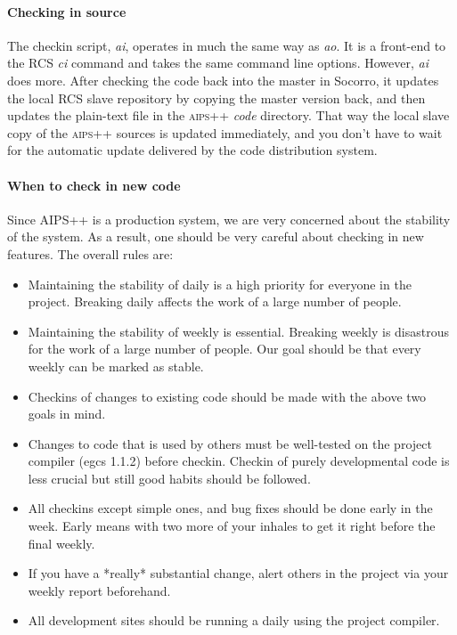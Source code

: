 \paragraph{Checking in source}
The checkin script, \textit{ai}, operates in much the same way as \textit{ao}.  It is a
front-end to the RCS \textit{ci} command and takes the same command line options.
However, \textit{ai} does more.  After checking the code back into the master in
Socorro, it updates the local RCS slave repository by copying the
master version back, and then updates the plain-text file in the \textsc{aips++}
\textsl{code} directory.  That way the local slave copy of the \textsc{aips++}
sources is updated immediately, and you don't have to wait for the automatic
update delivered by the code distribution system.

\paragraph{When to check in new code}

Since AIPS++ is a production system, we are very concerned about the
stability of the system. As a result, one should be very careful about
checking in new features. The overall rules are:

\begin{itemize}
\item Maintaining the stability of daily is a high priority for
everyone in the project. Breaking daily affects the work of a large
number of people.
\item Maintaining the stability of weekly is essential. Breaking
weekly is disastrous for the work of a large number of people. Our
goal should be that every weekly can be marked as stable.
\item Checkins of changes to existing code should be made with
the above two goals in mind.
\item Changes to code that is used by others must be well-tested
on the project compiler (egcs 1.1.2) before checkin. Checkin of
purely developmental code is less crucial but still good habits 
should be followed. 
\item All checkins except simple ones, and bug fixes should be
done early in the week. Early means with two more of your inhales 
to get it right before the final weekly.
\item If you have a *really* substantial change, alert others
in the project via your weekly report beforehand.
\item All development sites should be running a daily using the
project compiler.
\end{itemize}

